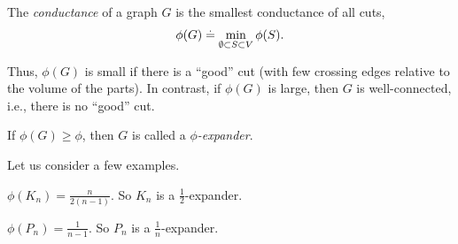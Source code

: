 \begin{defn}The \emph{conductance} of a graph $G$ is the smallest conductance of all cuts, \begin{align}
    \phi(G) \overset{.}{=} \min_{\emptyset \subset S \subset V} \phi(S).
\end{align}
\end{defn} Thus, $\phi(G)$ is small if there is a ``good'' cut (with few crossing edges relative to the volume of the parts). In contrast, if $\phi(G)$ is large, then $G$ is well-connected, i.e., there is no ``good'' cut.

\begin{defn}[Expander] If $\phi(G) \geq \phi$, then $G$ is called a \emph{$\phi$-expander}.
\end{defn}

Let us consider a few examples.

\begin{exc}\label{exc:expander_complete_graph}
$\phi(K_n) = \frac{n}{2(n-1)}$. So $K_n$ is a $\frac{1}{2}$-expander.
\end{exc}

\begin{exc}\label{exc:expander_path_graph}
$\phi(P_n) = \frac{1}{n-1}$. So $P_n$ is a $\frac{1}{n}$-expander.
\end{exc}

